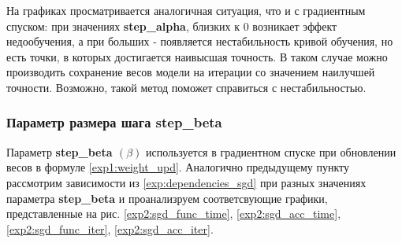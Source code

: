 \documentclass[a4paper, 11pt]{article}
\begin{document}
            На графиках просматривается аналогичная ситуация, что и с градиентным спуском: при значениях \textbf{step\_alpha}, близких к 0 возникает эффект недообучения, а при  больших - появляется нестабильность кривой обучения, но есть точки, в которых достигается наивысшая точность. В таком случае можно производить сохранение весов модели на итерации со значением наилучшей точности. Возможно, такой метод поможет справиться с нестабильностью.
            
            \subsubsection{Параметр размера шага step\_beta}
            Параметр \textbf{step\_beta $(\beta)$} используется в градиентном спуске при обновлении весов в формуле \ref{exp1:weight_upd}.
            Аналогично предыдущему пункту рассмотрим зависимости из \ref{exp:dependencies_sgd} при разных значениях параметра \textbf{step\_beta} и проанализруем соответсвующие графики, представленные на рис. \ref{exp2:sgd_func_time}, \ref{exp2:sgd_acc_time}, \ref{exp2:sgd_func_iter}, \ref{exp2:sgd_acc_iter}.
            
\end{document}
